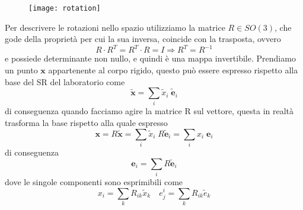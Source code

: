 \begin{figure}[!ht]
\texttt{[image: rotation]}	
\centering

\end{figure}
Per descrivere le rotazioni nello spazio utilizziamo la matrice $R \in SO(3)$, che gode della propriet\`{a} per cui la sua inversa, coincide con la trasposta, ovvero 
\begin{equation}
R \cdot R^{T} = R^{T} \cdot R = I  \Rightarrow R^{T} = R^{-1}	
\end{equation}
e possiede determinante non nullo, e quindi \`{e} una mappa invertibile. Prendiamo un punto $\bm{x}$ appartenente al corpo rigido, questo pu\`{o} essere espresso rispetto alla base del SR del laboratorio come 
\begin{equation*}
	\bm{\tilde{x}} = \sum_{i}\tilde{x}_i\; \bm{\tilde{e}}_i
\end{equation*}
di conseguenza quando facciamo agire la matrice R sul vettore, questa in realt\`{a} trasforma la base rispetto alla quale espresso 
\begin{equation}
	\bm{x} = R\bm{\tilde{x}} = \sum_{i}\tilde{x}_i\; R\bm{\tilde{e}}_i = \sum_{i}x_i\;\bm{e}_i 
\end{equation}
di conseguenza 
\begin{equation*}
	\bm{e}_i = \sum_{i}  R\bm{\tilde{e}}_i
\end{equation*}
dove le singole componenti sono esprimibili come 
\begin{equation*}
	x_i = \sum_{k}R_{ik}\tilde{x}_{k} \quad e_j^i = \sum_{k} R_{ik} \tilde{e}_k
\end{equation*} 
